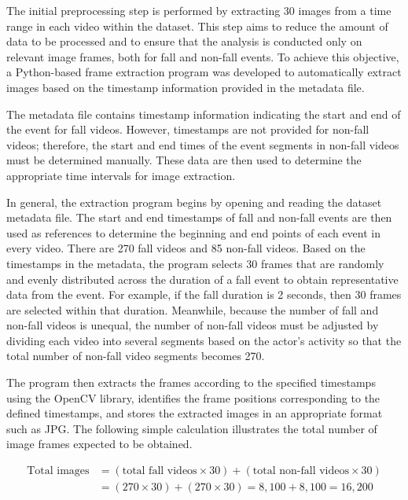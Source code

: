 \documentclass[10pt,TimesNewRoman,a4paper]{matrikenglish}
\begin{document}
The initial preprocessing step is performed by extracting 30 images from a time range in each video within the dataset. This step aims to reduce the amount of data to be processed and to ensure that the analysis is conducted only on relevant image frames, both for fall and non-fall events. To achieve this objective, a Python-based frame extraction program was developed to automatically extract images based on the timestamp information provided in the metadata file. \par

The metadata file contains timestamp information indicating the start and end of the event for fall videos. However, timestamps are not provided for non-fall videos; therefore, the start and end times of the event segments in non-fall videos must be determined manually. These data are then used to determine the appropriate time intervals for image extraction. \par

In general, the extraction program begins by opening and reading the dataset metadata file. The start and end timestamps of fall and non-fall events are then used as references to determine the beginning and end points of each event in every video. There are 270 fall videos and 85 non-fall videos. Based on the timestamps in the metadata, the program selects 30 frames that are randomly and evenly distributed across the duration of a fall event to obtain representative data from the event. For example, if the fall duration is 2 seconds, then 30 frames are selected within that duration. Meanwhile, because the number of fall and non-fall videos is unequal, the number of non-fall videos must be adjusted by dividing each video into several segments based on the actor’s activity so that the total number of non-fall video segments becomes 270. \par

The program then extracts the frames according to the specified timestamps using the OpenCV library, identifies the frame positions corresponding to the defined timestamps, and stores the extracted images in an appropriate format such as JPG. The following simple calculation illustrates the total number of image frames expected to be obtained. \par

\begin{align*}
    \text{Total images} &= (\text{total fall videos} \times 30) + (\text{total non-fall videos} \times 30) \label{eq:total citra}\\
    &= (270 \times 30) + (270 \times 30) = 8{,}100 + 8{,}100 = 16{,}200
\end{align*}
\vspace{7pt}
\end{document}
